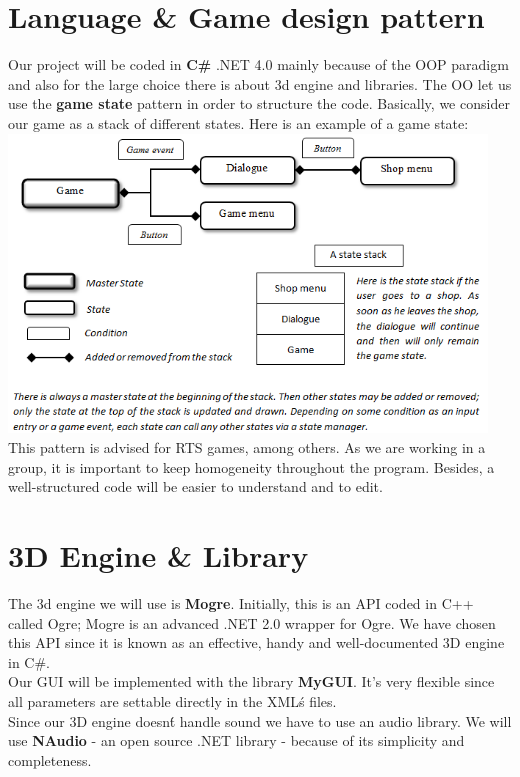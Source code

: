 \documentclass[article]{report} %
\begin{document}
     				\section{Language \& Game design pattern}
     						Our project will be coded in \textbf{C\#} .NET 4.0 mainly because of the \ac{OOP} paradigm and also for the large choice there is about 3d engine and libraries. The OO let us use the \textbf{game state} pattern in order to structure the code. Basically, we consider our game as a stack of different states. Here is an example of a game state:\newline
     						\includegraphics[height=300px]{Images/GameStateDesign.png}\\
     						
     						This pattern is advised for \ac{RTS} games, among others. As we are working in a group, it is important to keep homogeneity throughout the program. Besides, a well-structured code will be easier to understand and to edit.
						\section{3D Engine \& Library}
						The 3d engine we will use is \textbf{\ac{Mogre}}. Initially, this is an \ac{API} coded in C++ called Ogre; Mogre is an advanced .NET 2.0 wrapper for Ogre. We have chosen this \ac{API} since it is known as an effective, handy and well-documented 3D engine in C\#.\\			
						Our \ac{GUI} will be implemented with the library \textbf{\ac{MyGUI}}. It’s very flexible since all parameters are settable directly in the XML\'s files.\\	
						Since our 3D engine doesn\'t handle sound we have to use an audio library. We will use \textbf{NAudio} - an open source .NET library - because of its simplicity and completeness.
\end{document}
